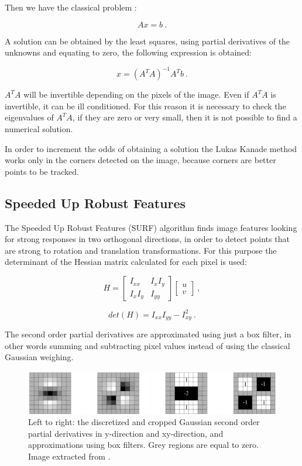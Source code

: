 \noindent Then we have the classical problem :

$$ 
Ax = b\ .
$$

\noindent A solution can be obtained by the least squares, using partial derivatives of the unknowns and equating to zero, the following expression
 is obtained:

$$
x = (A^T A)^{-1} A^T b \ .
$$


\noindent $A^T A$ will be invertible depending on the pixels of the image. Even if $A^T A $ is invertible, it can be ill conditioned. For this reason it is necessary to check the eigenvalues of $A^T A$, if they are zero or very small, then it is not possible to find a numerical solution.

In order to increment the odds of obtaining a solution the Lukas Kanade method works only in the corners detected on the image, because corners are better points to be tracked.

\subsection{Speeded Up Robust Features}
\label{sec:surf}

The Speeded Up Robust Features (SURF) algorithm finds image features looking for strong responses in two orthogonal directions, in order to detect points that are strong to rotation and translation transformations. For this purpose the determinant of the Hessian matrix calculated for each pixel is used:


$$
H = \begin{bmatrix} I_{xx} & I_x I_y \\ I_x I_y & I_{yy} \end{bmatrix} \begin{bmatrix} u \\ v \end{bmatrix} \ ,
$$

$$
det(H) = I_{xx} I_{yy} - I_{xy}^2\ .
$$


\noindent The second order partial derivatives are approximated using just a box filter, in other words 
summing and subtracting pixel values instead of using the classical Gaussian weighing. 

\begin{figure}[!h]
\begin{center}
\includegraphics[scale=0.35]{images/surf_mask}
\caption{Left to right: the discretized and cropped Gaussian second order partial derivatives 
in y-direction and xy-direction, and approximations using box filters. 
Grey regions are equal to zero. Image extracted from \cite{Bay06surf}.}
\end{center}
\end{figure}

